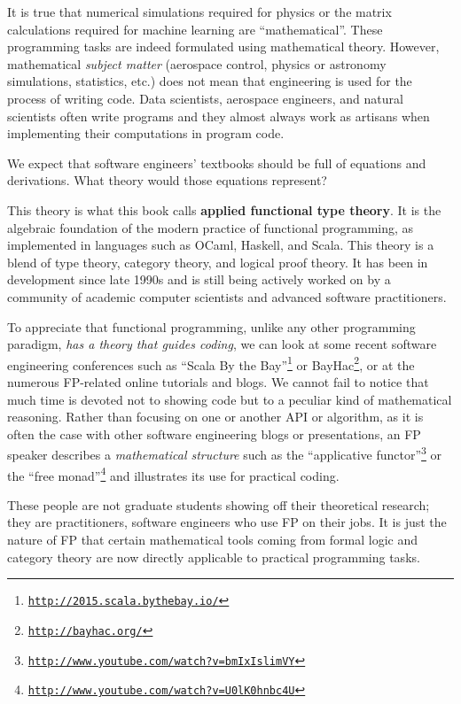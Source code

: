 It is true that numerical simulations required for physics or the
matrix calculations required for machine learning are ``mathematical''.
These programming tasks are indeed formulated using mathematical theory.
However, mathematical \emph{subject matter} (aerospace control, physics
or astronomy simulations, statistics, etc.) does not mean that engineering
is used for the process of writing code. Data scientists, aerospace
engineers, and natural scientists often write programs \textemdash{}
and they almost always work as artisans when implementing their computations
in program code.

We expect that software engineers' textbooks should be full of equations
and derivations. What theory would those equations represent?

This theory is what this book calls \textbf{applied functional type
theory}. It is the algebraic
foundation of the modern practice of functional programming, as implemented
in languages such as OCaml, Haskell, and Scala. This theory is a blend
of type theory, category theory, and logical proof theory. It has
been in development since late 1990s and is still being actively worked
on by a community of academic computer scientists and advanced software
practitioners.

To appreciate that functional programming, unlike any other programming
paradigm, \emph{has a theory that guides coding}, we can look at some
recent software engineering conferences such as ``Scala By the Bay''\footnote{\texttt{\href{http://2015.scala.bythebay.io/}{http://2015.scala.bythebay.io/}}}
or BayHac\footnote{\texttt{\href{http://bayhac.org/}{http://bayhac.org/}}},
or at the numerous FP-related online tutorials and blogs. We cannot
fail to notice that much time is devoted not to showing code but to
a peculiar kind of mathematical reasoning. Rather than focusing on
one or another API or algorithm, as it is often the case with other
software engineering blogs or presentations, an FP speaker describes
a \emph{mathematical structure} \textemdash{} such as the ``applicative
functor''\footnote{\texttt{\href{http://www.youtube.com/watch?v=bmIxIslimVY}{http://www.youtube.com/watch?v=bmIxIslimVY}}}
or the ``free monad''\footnote{\texttt{\href{http://www.youtube.com/watch?v=U0lK0hnbc4U}{http://www.youtube.com/watch?v=U0lK0hnbc4U}}}
\textemdash{} and illustrates its use for practical coding.

These people are not graduate students showing off their theoretical
research; they are practitioners, software engineers who use FP on
their jobs. It is just the nature of FP that certain mathematical
tools \textemdash{} coming from formal logic and category theory \textemdash{}
are now directly applicable to practical programming tasks.


